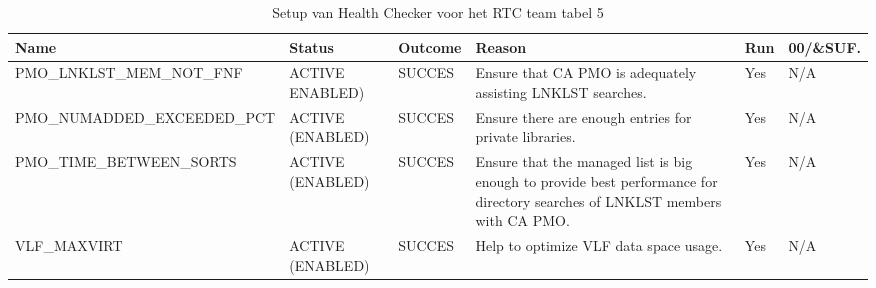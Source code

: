 \begin{landscape}
	\begin{table}[h]
		\begin{tabular}{|l|p{2.3cm}|l|p{4.5cm}|l|l|}
			\hline
			\textbf{Name}                       & \textbf{Status}   & \textbf{Outcome} & \textbf{Reason}    & \textbf{Run} &	\textbf{00/\&SUF.} \\ \hline
			PMO\_LNKLST\_MEM\_NOT\_FNF   & ACTIVE ENABLED) & SUCCES & Ensure   that CA PMO is adequately assisting LNKLST searches.                                                                         & Yes & N/A \\ \hline
			PMO\_NUMADDED\_EXCEEDED\_PCT & ACTIVE (ENABLED) & SUCCES & Ensure   there are enough entries for private libraries.                                                                              & Yes & N/A \\ \hline
			PMO\_TIME\_BETWEEN\_SORTS    & ACTIVE (ENABLED) & SUCCES & Ensure   that the managed list is big enough to provide best performance for directory      searches   of LNKLST members with CA PMO. & Yes & N/A \\ \hline
			VLF\_MAXVIRT                 & ACTIVE (ENABLED) & SUCCES & Help to   optimize VLF data space usage.                                                                                              & Yes & N/A \\ \hline
		\end{tabular}
		\caption[Health Checker RTC team tabel 5]{Setup van Health Checker voor het RTC team tabel 5}
		\label{tbl:RTC Team Tabel 5}
	\end{table}
\end{landscape}

